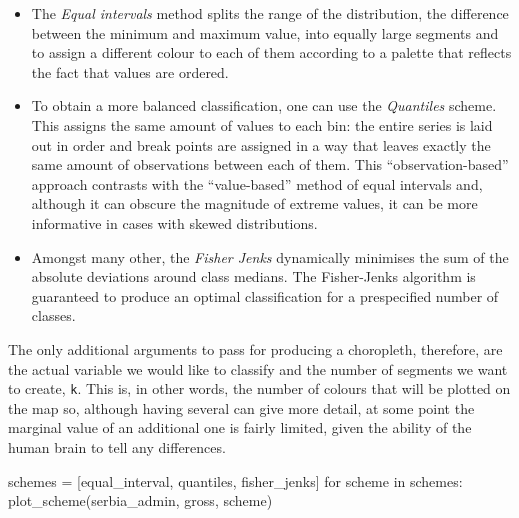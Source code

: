 \documentclass[
  letterpaper,
  DIV=11,
  numbers=noendperiod]{scrreprt}
\newenvironment{Shaded}{\begin{snugshade}}{\end{snugshade}}
\newcommand{\ControlFlowTok}[1]{\textcolor[rgb]{0.00,0.23,0.31}{#1}}
\newcommand{\KeywordTok}[1]{\textcolor[rgb]{0.00,0.23,0.31}{#1}}
\newcommand{\NormalTok}[1]{\textcolor[rgb]{0.00,0.23,0.31}{#1}}
\newcommand{\OperatorTok}[1]{\textcolor[rgb]{0.37,0.37,0.37}{#1}}
\newcommand{\StringTok}[1]{\textcolor[rgb]{0.13,0.47,0.30}{#1}}
\providecommand{\tightlist}{%
  \setlength{\itemsep}{0pt}\setlength{\parskip}{0pt}}\usepackage{longtable,booktabs,array}
\begin{document}
\begin{itemize}
\tightlist
\item
  The \emph{Equal intervals} method splits the range of the
  distribution, the difference between the minimum and maximum value,
  into equally large segments and to assign a different colour to each
  of them according to a palette that reflects the fact that values are
  ordered.
\item
  To obtain a more balanced classification, one can use the
  \emph{Quantiles} scheme. This assigns the same amount of values to
  each bin: the entire series is laid out in order and break points are
  assigned in a way that leaves exactly the same amount of observations
  between each of them. This ``observation-based'' approach contrasts
  with the ``value-based'' method of equal intervals and, although it
  can obscure the magnitude of extreme values, it can be more
  informative in cases with skewed distributions.
\item
  Amongst many other, the \emph{Fisher Jenks} dynamically minimises the
  sum of the absolute deviations around class medians. The Fisher-Jenks
  algorithm is guaranteed to produce an optimal classification for a
  prespecified number of classes.
\end{itemize}

The only additional arguments to pass for producing a choropleth,
therefore, are the actual variable we would like to classify and the
number of segments we want to create, \texttt{k}. This is, in other
words, the number of colours that will be plotted on the map so,
although having several can give more detail, at some point the marginal
value of an additional one is fairly limited, given the ability of the
human brain to tell any differences.

\begin{Shaded}
\begin{Highlighting}[]
\NormalTok{schemes }\OperatorTok{=}\NormalTok{ [}\StringTok{\textquotesingle{}equal\_interval\textquotesingle{}}\NormalTok{, }\StringTok{\textquotesingle{}quantiles\textquotesingle{}}\NormalTok{, }\StringTok{\textquotesingle{}fisher\_jenks\textquotesingle{}}\NormalTok{]}
\ControlFlowTok{for}\NormalTok{ scheme }\KeywordTok{in}\NormalTok{ schemes:}
\NormalTok{    plot\_scheme(serbia\_admin, }\StringTok{\textquotesingle{}gross\textquotesingle{}}\NormalTok{, scheme)}
\end{Highlighting}
\end{Shaded}
\end{document}
